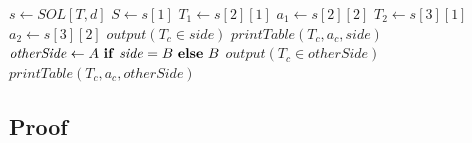 \documentclass[12pt]{article}
\begin{document}
\begin{itemize}
\begin{algorithmic}
	\State $s \gets \mathit{SOL}[T, d]$
	\State $S \gets s[1]$
	\State $T_1 \gets s[2][1]$
	\State $a_1 \gets s[2][2]$
	\State $T_2 \gets s[3][1]$
	\State $a_2 \gets s[3][2]$
			\State $\mathit{output}(T_c \in \mathit{side})$
			\State $\mathit{printTable}(T_c, a_c, \mathit{side})$
		\Else
			\State $\mathit{otherSide} \gets A \mbox{ \textbf{if} } \mathit{side} = B \mbox{ \textbf{else} } B$
			\State $\mathit{output}(T_c \in \mathit{otherSide})$
			\State $\mathit{printTable}(T_c, a_c, \mathit{otherSide})$
		\EndIf
	\EndIf
	\EndFor
\end{algorithmic}
\end{itemize}

\subsection*{Proof}
\end{document}
